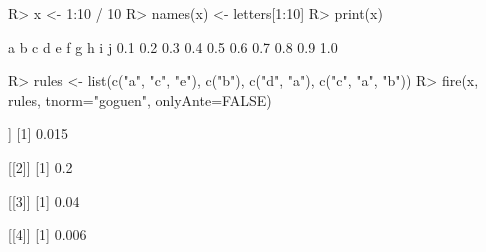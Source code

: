 \begin{Schunk}
% --begin: "fire"
\begin{Sinput}
R> x <- 1:10 / 10
R> names(x) <- letters[1:10]
R> print(x)
\end{Sinput}
\begin{Soutput}
  a   b   c   d   e   f   g   h   i   j 
0.1 0.2 0.3 0.4 0.5 0.6 0.7 0.8 0.9 1.0 
\end{Soutput}
\begin{Sinput}
R> rules <- list(c("a", "c", "e"),
                 c("b"),
                 c("d", "a"),
                 c("c", "a", "b"))
R> fire(x, rules, tnorm="goguen", onlyAnte=FALSE)
\end{Sinput}
\begin{Soutput}
[[1]]
[1] 0.015

[[2]]
[1] 0.2

[[3]]
[1] 0.04

[[4]]
[1] 0.006
\end{Soutput}
%
% --end: "fire"
\end{Schunk}
